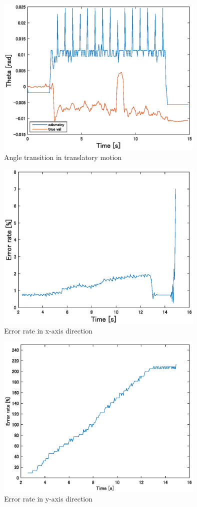 \documentclass[a4paper,11pt]{jsarticle}
\begin{document}
\begin{figure}[H]\centering
\includegraphics[width=100mm]{figure/1_2.eps}
\caption{Angle transition in translatory motion}
\label{ex1_2}\vspace{0zh}\end{figure}

\begin{figure}[H]\centering
\includegraphics[width=100mm]{figure/1_3_xe.eps}
\caption{Error rate in x-axis direction}
\label{ex1_3}\vspace{0zh}\end{figure}

\begin{figure}[H]\centering
\includegraphics[width=100mm]{figure/1_4_ye.eps}
\caption{Error rate in y-axis direction}
\label{ex1_4}\vspace{0zh}\end{figure}
\end{document}
